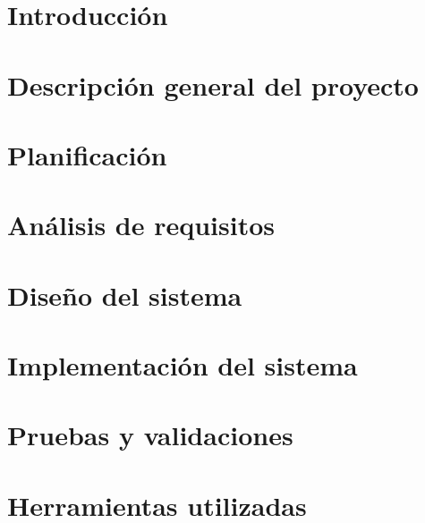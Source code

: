 \documentclass[a4paper,11pt]{book}
\begin{document}
\renewcommand{\figurename}{Figura}
\renewcommand{\listfigurename}{Indice de figuras}
\renewcommand{\tablename}{Tabla}
\renewcommand{\listtablename}{Indice de tablas}

\pagestyle{empty}

\cleardoublepage


\cleardoublepage
\pagestyle{plain}

\frontmatter %



\tableofcontents
\listoffigures
\listoftables

\mainmatter %

\chapter{Introducción}


\chapter{Descripción general del proyecto}


\chapter{Planificación}


\chapter{Análisis de requisitos}


\chapter{Diseño del sistema}


\chapter{Implementación del sistema}


\chapter{Pruebas y validaciones}


\chapter{Herramientas utilizadas}

\end{document}
